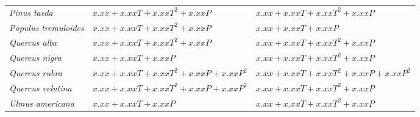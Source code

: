 \begin{table}[tb]
\begin{tabular}{lll}
{\it Pinus taeda}             & $x.xx + x.xxT + x.xxT^2 + x.xxP$           & $x.xx + x.xxT + x.xxT^2 + x.xxP$            \\
{\it Populus tremuloides}     & $x.xx + x.xxT + x.xxT^2 + x.xxP$           & $x.xx + x.xxT + x.xxP$                      \\ 
{\it Quercus alba}            & $x.xx + x.xxT + x.xxT^2 + x.xxP$           & $x.xx + x.xxT + x.xxT^2 + x.xxP$            \\
{\it Quercus nigra}           & $x.xx + x.xxT + x.xxP$                     & $x.xx + x.xxT + x.xxT^2 + x.xxP$            \\
{\it Quercus rubra}           & $x.xx + x.xxT + x.xxT^2 + x.xxP + x.xxP^2$ & $x.xx + x.xxT + x.xxT^2 + x.xxP + x.xxP^2$  \\
{\it Quercus velutina}        & $x.xx + x.xxT + x.xxT^2 + x.xxP + x.xxP^2$ & $x.xx + x.xxT + x.xxT^2 + x.xxP$            \\
{\it Ulmus americana}         & $x.xx + x.xxT + x.xxP$                     & $x.xx + x.xxT + x.xxT^2 + x.xxP$            \\ 
\bottomrule
\end{tabular}
\end{table}


